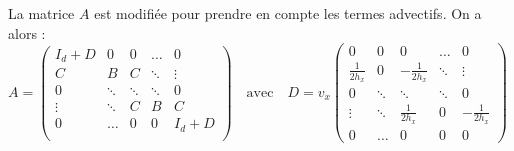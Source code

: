 \documentclass[12pt,a4paper]{article}
\begin{document}
\begin{enumerate}[resume]
        La matrice $A$ est modifiée pour prendre en compte les termes advectifs. On a alors : \\
        $A = \begin{pmatrix}
            I_d + D & 0 & 0 & \dots & 0 \\
            C & B & C & \ddots & \vdots \\
            0 & \ddots & \ddots & \ddots & 0 \\
            \vdots & \ddots & C & B & C \\
            0 & \dots & 0 & 0 & I_d + D \\
        \end{pmatrix} \quad \text{avec} \quad D = v_x \begin{pmatrix}
            0 & 0 & 0 & \dots & 0 \\
            \frac{1}{2h_x} & 0 & -\frac{1}{2h_x} & \ddots & \vdots \\
            0 & \ddots & \ddots & \ddots & 0 \\
            \vdots & \ddots & \frac{1}{2h_x} & 0 & -\frac{1}{2h_x} \\
            0 & \dots & 0 & 0 & 0
        \end{pmatrix}$\\

\end{enumerate}
\end{document}
